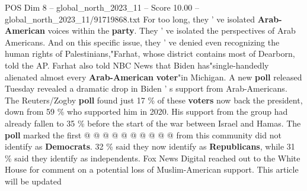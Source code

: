 \begin{textsample}{POS Dim 8 – global\_north\_2023\_11 – Score 10.00 – global\_north\_2023\_11/91719868.txt}
For too long, they ' ve isolated \textbf{Arab-American} voices within the \textbf{party}.
They ' ve isolated the perspectives of Arab Americans.
And on this specific issue, they ' ve denied even recognizing the human rights of Palestinians,"Farhat, whose district contains most of Dearborn, told the AP.
Farhat also told NBC News that Biden has"single-handedly alienated almost every \textbf{Arab-American} \textbf{voter}"in Michigan.
A new \textbf{poll} released Tuesday revealed a dramatic drop in Biden ' s support from Arab-Americans.
The Reuters/Zogby \textbf{poll} found just 17 \% of these \textbf{voters} now back the president, down from 59 \% who supported him in 2020.
His support from the group had already fallen to 35 \% before the start of the war between Israel and Hamas.
The \textbf{poll} marked the first @ @ @ @ @ @ @ @ @ @ from this community did not identify as \textbf{Democrats}. 32 \% said they now identify as \textbf{Republicans}, while 31 \% said they identify as independents.
Fox News Digital reached out to the White House for comment on a potential loss of Muslim-American support.
This article will be updated

\end{textsample}
